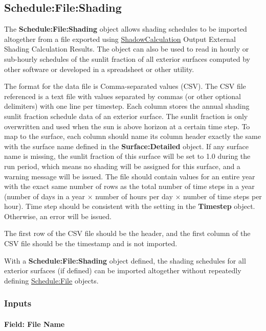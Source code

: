 \subsection{Schedule:File:Shading}\label{schedulefileshading}

The \textbf{Schedule:File:Shading} object allows shading schedules to be imported altogether from a file exported using \hyperref[shadowcalculation]{ShadowCalculation} Output External Shading Calculation Results. The object can also be used to read in hourly or sub-hourly schedules of the sunlit fraction of all exterior surfaces computed by other software or developed in a spreadsheet or other utility.

The format for the data file is Comma-separated values (CSV). The CSV file referenced is a text file with values separated by commas (or other optional delimiters) with one line per timestep. Each column stores the annual shading sunlit fraction schedule data of an exterior surface. The sunlit fraction is only overwritten and used when the sun is above horizon at a certain time step. To map to the surface, each column should name its column header exactly the same with the surface name defined in the \textbf{Surface:Detailed} object. If any surface name is missing, the sunlit fraction of this surface will be set to 1.0 during the run period, which means no shading will be assigned for this surface, and a warning message will be issued. The file should contain values for an entire year with the exact same number of rows as the total number of time steps in a year (number of days in a year $\times$ number of hours per day $\times$ number of time steps per hour). Time step should be consistent with the setting in the \textbf{Timestep} object. Otherwise, an error will be issued.

The first row of the CSV file should be the header, and the first column of the CSV file should be the timestamp and is not imported.

With a \textbf{Schedule:File:Shading} object defined, the shading schedules for all exterior surfaces (if defined) can be imported altogether without repeatedly defining \hyperref[schedulefile]{Schedule:File} objects.

\subsubsection{Inputs}\label{inputs-schedule-file-shading}

\paragraph{Field: File Name}\label{schedulefileshading-field-file-name}

